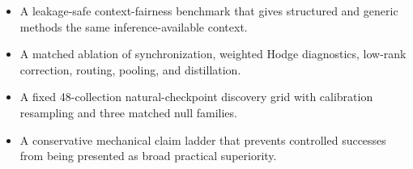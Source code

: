 \begin{itemize}
\item A leakage-safe context-fairness benchmark that gives structured and generic methods the same inference-available context.
\item A matched ablation of synchronization, weighted Hodge diagnostics, low-rank correction, routing, pooling, and distillation.
\item A fixed 48-collection natural-checkpoint discovery grid with calibration resampling and three matched null families.
\item A conservative mechanical claim ladder that prevents controlled successes from being presented as broad practical superiority.
\end{itemize}
